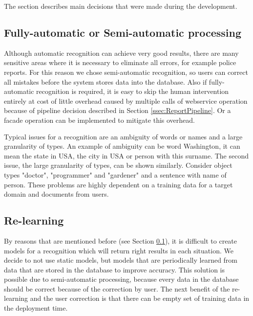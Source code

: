 
The section describes main decisions that were made during the development. 

\subsection{Fully-automatic or Semi-automatic processing}
\label{ssec:processing}

Although automatic recognition can achieve very good results, there are many
sensitive areas where it is necessary to eliminate all errors, for example
police reports. For this reason we chose semi-automatic recognition, so users
can correct all mistakes before the system stores data into the database. 
Also if fully-automatic recognition is required, it is easy
to skip the human intervention entirely at cost of little overhead caused by
multiple calls of webservice operation because of pipeline decision described in
Section \ref{ssec:ReportPipeline}. Or a facade operation can be implemented to
mitigate this overhead.

Typical issues for a recognition are an ambiguity of words or names and a large
granularity of types. An example of ambiguity can be word Washington, it can mean
the state in USA, the city in USA or person with this surname. The second issue,
the large granularity of types, can be shown similarly. Consider object types "doctor",
"programmer" and "gardener" and a sentence with name of person. These problems are
highly dependent on a training data for a target domain and documents from users.

\subsection{Re-learning}
By reasons that are mentioned before (see Section \ref{ssec:processing}), it is difficult
to create models for a recognition which will return right results in each situation.
We decide to not use static models, but models that are periodically learned from
data that are stored in the database to improve accuracy. This solution is possible
due to semi-automatic processing, because every data in the database should be
correct because of the correction by user. The next benefit of the re-learning and
the user correction is that there can be empty set of training data in the deployment
time.



